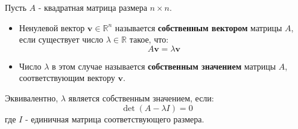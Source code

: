 \newpage
\begin{dfn}{}
Пусть $A$ - квадратная матрица размера $n \times n$.

\begin{itemize}
\item Ненулевой вектор $\mathbf{v} \in \mathbb{R}^n$ называется \textbf{собственным вектором} матрицы $A$, если существует число $\lambda \in \mathbb{R}$ такое, что:
$$ A\mathbf{v} = \lambda\mathbf{v} $$

\item Число $\lambda$ в этом случае называется \textbf{собственным значением} матрицы $A$, соответствующим вектору $\mathbf{v}$.
\end{itemize}

Эквивалентно, $\lambda$ является собственным значением, если:
\begin{equation*}
\det(A - \lambda I) = 0
\end{equation*}
где $I$ - единичная матрица соответствующего размера.
\end{dfn}{}
